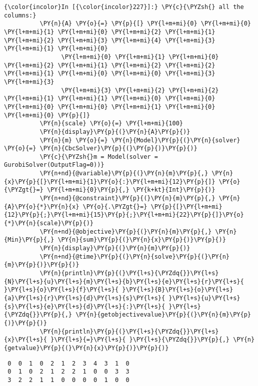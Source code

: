     \begin{Verbatim}[commandchars=\\\{\}]
{\color{incolor}In [{\color{incolor}227}]:} \PY{c}{\PYZsh{} all the columns:}
          \PY{n}{A} \PY{o}{=} \PY{p}{[} \PY{l+m+mi}{0} \PY{l+m+mi}{0} \PY{l+m+mi}{1} \PY{l+m+mi}{0} \PY{l+m+mi}{2} \PY{l+m+mi}{1} \PY{l+m+mi}{2} \PY{l+m+mi}{3} \PY{l+m+mi}{4} \PY{l+m+mi}{3} \PY{l+m+mi}{1} \PY{l+m+mi}{0}
                \PY{l+m+mi}{0} \PY{l+m+mi}{1} \PY{l+m+mi}{0} \PY{l+m+mi}{2} \PY{l+m+mi}{1} \PY{l+m+mi}{2} \PY{l+m+mi}{2} \PY{l+m+mi}{1} \PY{l+m+mi}{0} \PY{l+m+mi}{0} \PY{l+m+mi}{3} \PY{l+m+mi}{3}
                \PY{l+m+mi}{3} \PY{l+m+mi}{2} \PY{l+m+mi}{2} \PY{l+m+mi}{1} \PY{l+m+mi}{1} \PY{l+m+mi}{0} \PY{l+m+mi}{0} \PY{l+m+mi}{0} \PY{l+m+mi}{0} \PY{l+m+mi}{1} \PY{l+m+mi}{0} \PY{l+m+mi}{0} \PY{p}{]}
          \PY{n}{scale} \PY{o}{=} \PY{l+m+mi}{100}
          \PY{n}{display}\PY{p}{(}\PY{n}{A}\PY{p}{)}
          \PY{n}{m} \PY{o}{=} \PY{n}{Model}\PY{p}{(}\PY{n}{solver} \PY{o}{=} \PY{n}{CbcSolver}\PY{p}{(}\PY{p}{)}\PY{p}{)}
          \PY{c}{\PYZsh{}m = Model(solver = GurobiSolver(OutputFlag=0))}
          \PY{n+nd}{@variable}\PY{p}{(}\PY{n}{m}\PY{p}{,} \PY{n}{x}\PY{p}{[}\PY{l+m+mi}{1}\PY{o}{:}\PY{l+m+mi}{12}\PY{p}{]} \PY{o}{\PYZgt{}=} \PY{l+m+mi}{0}\PY{p}{,} \PY{k+kt}{Int}\PY{p}{)}
          \PY{n+nd}{@constraint}\PY{p}{(}\PY{n}{m}\PY{p}{,} \PY{n}{A}\PY{o}{*}\PY{n}{x} \PY{o}{.\PYZgt{}=} \PY{p}{[}\PY{l+m+mi}{12}\PY{p}{;}\PY{l+m+mi}{15}\PY{p}{;}\PY{l+m+mi}{22}\PY{p}{]}\PY{o}{*}\PY{n}{scale}\PY{p}{)}
          \PY{n+nd}{@objective}\PY{p}{(}\PY{n}{m}\PY{p}{,} \PY{n}{Min}\PY{p}{,} \PY{n}{sum}\PY{p}{(}\PY{n}{x}\PY{p}{)}\PY{p}{)}
          \PY{n}{display}\PY{p}{(}\PY{n}{m}\PY{p}{)}
          \PY{n+nd}{@time}\PY{p}{(}\PY{n}{solve}\PY{p}{(}\PY{n}{m}\PY{p}{)}\PY{p}{)}
          \PY{n}{println}\PY{p}{(}\PY{l+s}{\PYZdq{}}\PY{l+s}{N}\PY{l+s}{u}\PY{l+s}{m}\PY{l+s}{b}\PY{l+s}{e}\PY{l+s}{r}\PY{l+s}{ }\PY{l+s}{o}\PY{l+s}{f}\PY{l+s}{ }\PY{l+s}{B}\PY{l+s}{o}\PY{l+s}{a}\PY{l+s}{r}\PY{l+s}{d}\PY{l+s}{s}\PY{l+s}{ }\PY{l+s}{u}\PY{l+s}{s}\PY{l+s}{e}\PY{l+s}{d}\PY{l+s}{:}\PY{l+s}{ }\PY{l+s}{\PYZdq{}}\PY{p}{,} \PY{n}{getobjectivevalue}\PY{p}{(}\PY{n}{m}\PY{p}{)}\PY{p}{)}
          \PY{n}{println}\PY{p}{(}\PY{l+s}{\PYZdq{}}\PY{l+s}{x}\PY{l+s}{ }\PY{l+s}{=}\PY{l+s}{ }\PY{l+s}{\PYZdq{}}\PY{p}{,} \PY{n}{getvalue}\PY{p}{(}\PY{n}{x}\PY{p}{)}\PY{p}{)}
\end{Verbatim}


    
    \begin{verbatim}
 0  0  1  0  2  1  2  3  4  3  1  0
 0  1  0  2  1  2  2  1  0  0  3  3
 3  2  2  1  1  0  0  0  0  1  0  0
    \end{verbatim}


